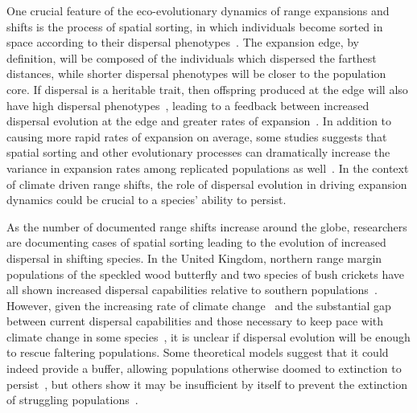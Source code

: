 \documentclass[11pt]{article}
\begin{document}
One crucial feature of the eco-evolutionary dynamics of range expansions and shifts is the process of spatial sorting, in which individuals become sorted in space according to their dispersal phenotypes~\citep{shine2011evolutionary}. The expansion edge, by definition, will be composed of the individuals which dispersed the farthest distances, while shorter dispersal phenotypes will be closer to the population core. If dispersal is a heritable trait, then offspring produced at the edge will also have high dispersal phenotypes~\citep{fronhofer2015eco}, leading to a feedback between increased dispersal evolution at the edge and greater rates of expansion~\citep{phillips2006invasion, alex2013evolution, burton2010trade, williams2016rapid}. In addition to causing more rapid rates of expansion on average, some studies suggests that spatial sorting and other evolutionary processes can dramatically increase the variance in expansion rates among replicated populations as well~\citep{weiss2017rapid, ochocki2017rapid, phillips2015evolutionary}. In the context of climate driven range shifts, the role of dispersal evolution in driving expansion dynamics could be crucial to a species' ability to persist.

As the number of documented range shifts increase around the globe, researchers are documenting cases of spatial sorting leading to the evolution of increased dispersal in shifting species. In the United Kingdom, northern range margin populations of the speckled wood butterfly and two species of bush crickets have all shown increased dispersal capabilities relative to southern populations~\citep{hill1999flight, thomas2001ecological}. However, given the increasing rate of climate change~\citep{chen2017increasing} and the substantial gap between current dispersal capabilities and those necessary to keep pace with climate change in some species~\citep{schloss2012dispersal}, it is unclear if dispersal evolution will be enough to rescue faltering populations. Some theoretical models suggest that it could indeed provide a buffer, allowing populations otherwise doomed to extinction to persist~\citep{boeye2013more}, but others show it may be insufficient by itself to prevent the extinction of struggling populations~\citep{weiss2019spatial}. 
\end{document}
